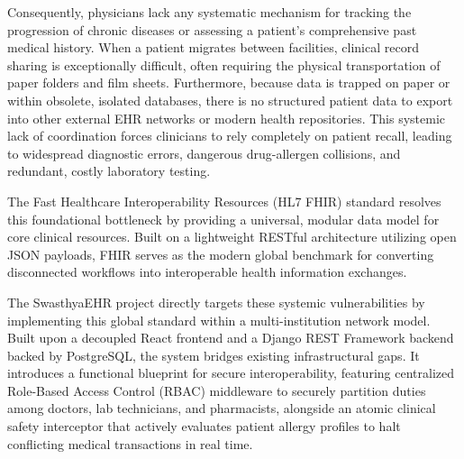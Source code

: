 \documentclass[12pt, a4paper]{report}
\numberwithin{equation}{chapter}
\begin{document}
Consequently, physicians lack any systematic mechanism for tracking the progression of chronic diseases or assessing a patient’s comprehensive past medical history. When a patient migrates between facilities, clinical record sharing is exceptionally difficult, often requiring the physical transportation of paper folders and film sheets. Furthermore, because data is trapped on paper or within obsolete, isolated databases, there is no structured patient data to export into other external EHR networks or modern health repositories. This systemic lack of coordination forces clinicians to rely completely on patient recall, leading to widespread diagnostic errors, dangerous drug-allergen collisions, and redundant, costly laboratory testing.

The Fast Healthcare Interoperability Resources (HL7 FHIR) standard resolves this foundational bottleneck by providing a universal, modular data model for core clinical resources. Built on a lightweight RESTful architecture utilizing open JSON payloads, FHIR serves as the modern global benchmark for converting disconnected workflows into interoperable health information exchanges. 

The SwasthyaEHR project directly targets these systemic vulnerabilities by implementing this global standard within a multi-institution network model. Built upon a decoupled React frontend and a Django REST Framework backend backed by PostgreSQL, the system bridges existing infrastructural gaps. It introduces a functional blueprint for secure interoperability, featuring centralized Role-Based Access Control (RBAC) middleware to securely partition duties among doctors, lab technicians, and pharmacists, alongside an atomic clinical safety interceptor that actively evaluates patient allergy profiles to halt conflicting medical transactions in real time.


\clearpage
\end{document}
